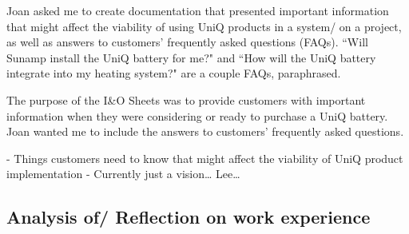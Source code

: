 Joan asked me to create documentation that presented important information that might affect the viability of using UniQ products in a system/ on a project, as well as answers to customers' frequently asked questions (FAQs).
``Will Sunamp install the UniQ battery for me?" and ``How will the UniQ battery integrate into my heating system?" are a couple FAQs, paraphrased.

The purpose of the I\&O Sheets was to provide customers with important information when they were considering or ready to purchase a UniQ battery.
Joan wanted me to include the answers to customers' frequently asked questions.

- Things customers need to know that might affect the viability of UniQ product implementation
- Currently just a vision… Lee…




\subsection{Analysis of/ Reflection on work experience}


